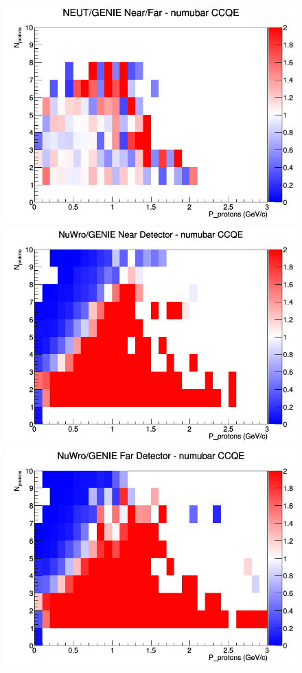 \documentclass[12pt]{article}
\begin{document}
\begin{figure}[h]
\endminipage
{}
\includegraphics[width=\linewidth]{N_P/nominal/protons/ratios/CCQE_NEUT_GENIE_numubar_NF_N_P.png}
\endminipage
\newline
{}
\includegraphics[width=\linewidth]{N_P/nominal/protons/ratios/CCQE_NuWro_GENIE_numubar_near_N_P.png}
\endminipage
{}
\includegraphics[width=\linewidth]{N_P/nominal/protons/ratios/CCQE_NuWro_GENIE_numubar_far_N_P.png}

\end{figure}
\end{document}
